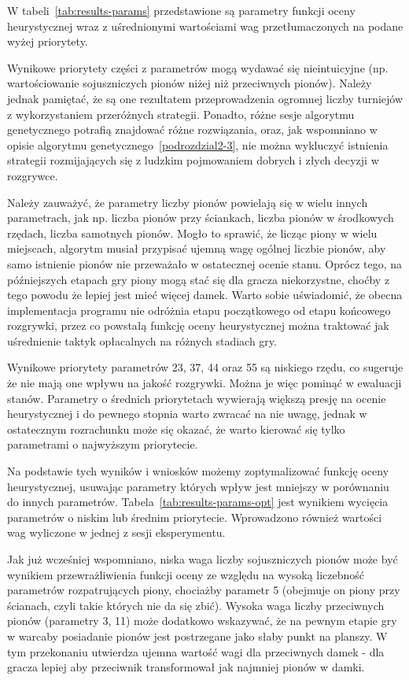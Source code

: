 W tabeli~\ref{tab:results-params} przedstawione są parametry funkcji oceny heurystycznej wraz z uśrednionymi wartościami wag przetłumaczonych na podane wyżej priorytety.



Wynikowe priorytety części z parametrów mogą wydawać się nieintuicyjne (np. wartościowanie sojuszniczych pionów niżej niż przeciwnych pionów). Należy jednak pamiętać, że są one rezultatem przeprowadzenia ogromnej liczby turniejów z wykorzystaniem przeróżnych strategii. Ponadto, różne sesje algorytmu genetycznego potrafią znajdować różne rozwiązania, oraz, jak wspomniano w opisie algorytmu genetycznego~\ref{podrozdzial2-3}, nie można wykluczyć istnienia strategii rozmijających się z ludzkim pojmowaniem dobrych i złych decyzji w rozgrywce.

Należy zauważyć, że parametry liczby pionów powielają się w wielu innych parametrach, jak np. liczba pionów przy ściankach, liczba pionów w środkowych rzędach, liczba samotnych pionów. Mogło to sprawić, że licząc piony w wielu miejscach, algorytm musiał przypisać ujemną wagę ogólnej liczbie pionów, aby samo istnienie pionów nie przeważało w ostatecznej ocenie stanu. Oprócz tego, na późniejszych etapach gry piony mogą stać się dla gracza niekorzystne, choćby z tego powodu że lepiej jest mieć więcej damek. Warto sobie uświadomić, że obecna implementacja programu nie odróżnia etapu początkowego od etapu końcowego rozgrywki, przez co powstałą funkcję oceny heurystycznej można traktować jak uśrednienie taktyk opłacalnych na różnych stadiach gry.

Wynikowe priorytety parametrów 23, 37, 44 oraz 55 są niskiego rzędu, co sugeruje że nie mają one wpływu na jakość rozgrywki. Można je więc pominąć w ewaluacji stanów. Parametry o średnich priorytetach wywierają większą presję na ocenie heurystycznej i do pewnego stopnia warto zwracać na nie uwagę, jednak w ostatecznym rozrachunku może się okazać, że warto kierować się tylko parametrami o najwyższym priorytecie.

Na podstawie tych wyników i wniosków możemy zoptymalizować funkcję oceny heurystycznej, usuwając parametry których wpływ jest mniejszy w porównaniu do innych parametrów. Tabela~\ref{tab:results-params-opt} jest wynikiem wycięcia parametrów o niskim lub średnim priorytecie. Wprowadzono również wartości wag wyliczone w jednej z sesji eksperymentu.



Jak już wcześniej wspomniano, niska waga liczby sojuszniczych pionów może być wynikiem przewrażliwienia funkcji oceny ze względu na wysoką liczebność parametrów rozpatrujących piony, chociażby parametr 5 (obejmuje on piony przy ścianach, czyli takie których nie da się zbić). Wysoka waga liczby przeciwnych pionów (parametry 3, 11) może dodatkowo wskazywać, że na pewnym etapie gry w warcaby posiadanie pionów jest postrzegane jako słaby punkt na planszy. W tym przekonaniu utwierdza ujemna wartość wagi dla przeciwnych damek - dla gracza lepiej aby przeciwnik transformował jak najmniej pionów w damki.

